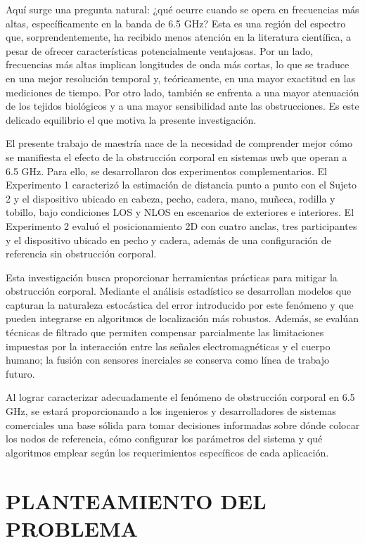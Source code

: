 Aquí surge una pregunta natural: ¿qué ocurre cuando se opera en frecuencias más altas, específicamente en la banda de 6.5 GHz? Esta es una región del espectro que, sorprendentemente, ha recibido menos atención en la literatura científica, a pesar de ofrecer características potencialmente ventajosas. Por un lado, frecuencias más altas implican longitudes de onda más cortas, lo que se traduce en una mejor resolución temporal y, teóricamente, en una mayor exactitud en las mediciones de tiempo. Por otro lado, también se enfrenta a una mayor atenuación de los tejidos biológicos y a una mayor sensibilidad ante las obstrucciones. Es este delicado equilibrio el que motiva la presente investigación.

El presente trabajo de maestría nace de la necesidad de comprender mejor cómo se manifiesta el efecto de la obstrucción corporal en sistemas \gls{uwb} que operan a 6.5 GHz. Para ello, se desarrollaron dos experimentos complementarios. El Experimento 1 caracterizó la estimación de distancia punto a punto con el Sujeto 2 y el dispositivo ubicado en cabeza, pecho, cadera, mano, muñeca, rodilla y tobillo, bajo condiciones LOS y NLOS en escenarios de exteriores e interiores. El Experimento 2 evaluó el posicionamiento 2D con cuatro anclas, tres participantes y el dispositivo ubicado en pecho y cadera, además de una configuración de referencia sin obstrucción corporal.

Esta investigación busca proporcionar herramientas prácticas para mitigar la obstrucción corporal. Mediante el análisis estadístico se desarrollan modelos que capturan la naturaleza estocástica del error introducido por este fenómeno y que pueden integrarse en algoritmos de localización más robustos. Además, se evalúan técnicas de filtrado que permiten compensar parcialmente las limitaciones impuestas por la interacción entre las señales electromagnéticas y el cuerpo humano; la fusión con sensores inerciales se conserva como línea de trabajo futuro.

Al lograr caracterizar adecuadamente el fenómeno de obstrucción corporal en 6.5 GHz, se estará proporcionando a los ingenieros y desarrolladores de sistemas comerciales una base sólida para tomar decisiones informadas sobre dónde colocar los nodos de referencia, cómo configurar los parámetros del sistema y qué algoritmos emplear según los requerimientos específicos de cada aplicación.

\section{PLANTEAMIENTO DEL PROBLEMA}
\label{ch:planteamiento}

